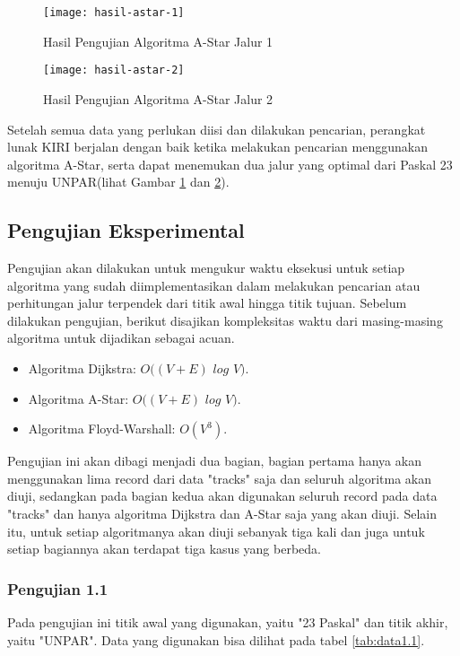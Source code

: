 \begin{figure}[H]
    \centering
    \texttt{[image: hasil-astar-1]}
    \caption{Hasil Pengujian Algoritma A-Star Jalur 1}
    \label{fig:hasilastar1}
\end{figure}

\begin{figure}[H]
    \centering
    \texttt{[image: hasil-astar-2]}
    \caption{Hasil Pengujian Algoritma A-Star Jalur 2}
    \label{fig:hasilastar2}
\end{figure}

\noindent
Setelah semua data yang perlukan diisi dan dilakukan pencarian, perangkat lunak KIRI berjalan dengan baik ketika melakukan pencarian menggunakan algoritma A-Star, serta dapat menemukan dua jalur yang optimal dari Paskal 23 menuju UNPAR(lihat Gambar \ref{fig:hasilastar1} dan \ref{fig:hasilastar2}).

\subsection{Pengujian Eksperimental}
\label{subsec:pengujianeksperimental}
Pengujian akan dilakukan untuk mengukur waktu eksekusi untuk setiap algoritma yang sudah diimplementasikan dalam melakukan pencarian atau perhitungan jalur terpendek dari titik awal hingga titik tujuan. Sebelum dilakukan pengujian, berikut disajikan kompleksitas waktu dari masing-masing algoritma untuk dijadikan sebagai acuan.
\begin{itemize}
    \item Algoritma Dijkstra: $O((V+E)$ $log$ $V)$.
    \item Algoritma A-Star: $O((V+E)$ $log$ $V)$.
    \item Algoritma Floyd-Warshall: $O(V^3)$.
\end{itemize}
\noindent
Pengujian ini akan dibagi menjadi dua bagian, bagian pertama hanya akan menggunakan lima record dari data "tracks" saja dan seluruh algoritma akan diuji, sedangkan pada bagian kedua akan digunakan seluruh record pada data "tracks" dan hanya algoritma Dijkstra dan A-Star saja yang akan diuji. Selain itu, untuk setiap algoritmanya akan diuji sebanyak tiga kali dan juga untuk setiap bagiannya akan terdapat tiga kasus yang berbeda.

\subsubsection{Pengujian 1.1}
Pada pengujian ini titik awal yang digunakan, yaitu "23 Paskal" dan titik akhir, yaitu "UNPAR". Data yang digunakan bisa dilihat pada tabel \ref{tab:data1.1}.

